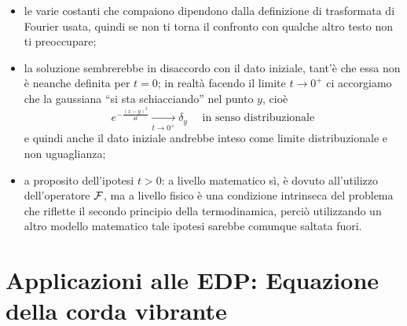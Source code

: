 \begin{itemize}
    \item le varie costanti che compaiono dipendono dalla definizione di trasformata di Fourier usata, quindi se non ti torna il confronto con qualche altro testo non ti preoccupare;
    \item la soluzione sembrerebbe in disaccordo con il dato iniziale, tant'è che essa non è neanche definita per $t=0$; in realtà facendo il limite $t\to0^+$ ci accorgiamo che la gaussiana ``si sta schiacciando'' nel punto $y$, cioè
    \begin{equation*}
    e^{-\frac{(x-y)^2}{4t}}\xrightarrow[t\to0^+]{}\delta_y\quad\text{ in senso distribuzionale}
    \end{equation*}
     e quindi anche il dato iniziale andrebbe inteso come limite distribuzionale e non uguaglianza;
     \item a proposito dell'ipotesi $t>0$: a livello matematico sì, è dovuto all'utilizzo dell'operatore $\mathcal{F}$, ma a livello fisico è una condizione intrinseca del problema che riflette il secondo principio della termodinamica, perciò utilizzando un altro modello matematico tale ipotesi sarebbe comunque saltata fuori.
\end{itemize}

\section{Applicazioni alle EDP: Equazione della corda vibrante}    

